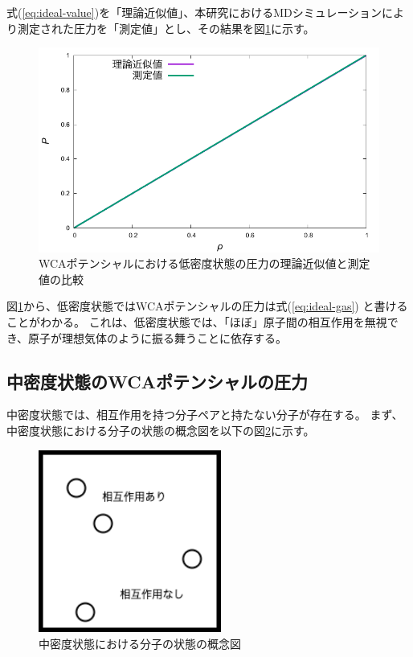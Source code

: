 \documentclass[titlepage]{jsreport}
\begin{document}
{{{式(\ref{eq:ideal-value})を「理論近似値」、本研究におけるMDシミュレーションにより測定された圧力を「測定値」とし、その結果を図\ref{fig:lowden_compare:den-pre}に示す。

\begin{figure}[htbp]
    \begin{center}
        \includegraphics[width=14cm]{fig/lowden_compare:den-pre.pdf}
    \end{center}
    \caption{WCAポテンシャルにおける低密度状態の圧力の理論近似値と測定値の比較}
    \label{fig:lowden_compare:den-pre}
\end{figure}

図\ref{fig:lowden_compare:den-pre}から、低密度状態ではWCAポテンシャルの圧力は式(\ref{eq:ideal-gas})
と書けることがわかる。
これは、低密度状態では、「ほぼ」原子間の相互作用を無視でき、原子が理想気体のように振る舞うことに依存する。


\subsection{中密度状態のWCAポテンシャルの圧力}\label{results-subsec:WCA-press-middle-density}
中密度状態では、相互作用を持つ分子ペアと持たない分子が存在する。
まず、中密度状態における分子の状態の概念図を以下の図\ref{fig:middledensity.png}に示す。

\begin{figure}[htbp]
    \begin{center}
        \includegraphics[width=6cm]{fig/middledensity.png}
    \end{center}
    \caption{中密度状態における分子の状態の概念図}
    \label{fig:middledensity.png}
\end{figure}

}}}
\end{document}
